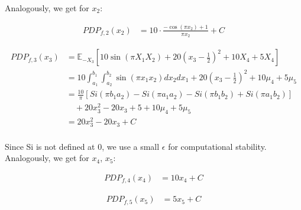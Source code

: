 \documentclass[runningheads]{llncs}
\begin{document}
\newpage
\noindent Analogously, we get for $x_2$:

\begin{align*}
    PDP_{f,2}(x_2) &= 10 \cdot \frac{-\cos(\pi x_2) + 1}{\pi x_2} + C
\end{align*}
    
\begin{align*}
    PDP_{f,3}(x_3) &= \mathbb{E}_{-X_3}[10\sin(\pi X_1X_2) + 20(x_3-\frac{1}{2})^2 + 10X_4 + 5X_4] \\
    &= 10\int_{a_1}^{b_1}\int_{a_2}^{b_2}\sin(\pi x_1x_2)dx_2dx_1 + 20(x_3-\frac{1}{2})^2 + 10\mu_4 + 5\mu_5 \\
    &= \frac{10}{\pi}[Si(\pi b_1a_2) - Si(\pi a_1a_2) - Si(\pi b_1b_2) + Si(\pi a_1b_2)] \\
    &\quad + 20x_3^2 - 20x_3 + 5 + 10\mu_4 + 5\mu_5 \\
    &= 20x_3^2 - 20x_3 + C \\
\end{align*}

\noindent Since Si is not defined at 0, we use a small $\epsilon$ for
computational stability.\newline
Analogously, we get for $x_4$, $x_5$:

\begin{align*}
    PDP_{f,4}(x_4) &= 10x_4 + C
\end{align*}

\begin{align*}
    PDP_{f,5}(x_5) &= 5x_5 + C
\end{align*}
\end{document}
